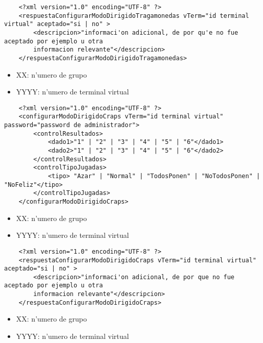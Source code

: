 \begin{verbatim}
    <?xml version="1.0" encoding="UTF-8" ?>
    <respuestaConfigurarModoDirigidoTragamonedas vTerm="id terminal virtual" aceptado="si | no" >
        <descripcion>"informaci'on adicional, de por qu'e no fue aceptado por ejemplo u otra
        informacion relevante"</descripcion>
    </respuestaConfigurarModoDirigidoTragamonedas>
\end{verbatim}


 
\begin{itemize}
    \item{XX: n'umero de grupo}
    \item{YYYY: n'umero de terminal virtual}
\end{itemize}

\begin{verbatim}
    <?xml version="1.0" encoding="UTF-8" ?>
    <configurarModoDirigidoCraps vTerm="id terminal virtual" password="password de administrador">
        <controlResultados>
            <dado1>"1" | "2" | "3" | "4" | "5" | "6"</dado1>
            <dado2>"1" | "2" | "3" | "4" | "5" | "6"</dado2>
        </controlResultados>
        <controlTipoJugadas>
            <tipo> "Azar" | "Normal" | "TodosPonen" | "NoTodosPonen" | "NoFeliz"</tipo>
        </controlTipoJugadas>
    </configurarModoDirigidoCraps>
\end{verbatim}


 
\begin{itemize}
    \item{XX: n'umero de grupo}
    \item{YYYY: n'umero de terminal virtual}
\end{itemize}

\begin{verbatim}
    <?xml version="1.0" encoding="UTF-8" ?>
    <respuestaConfigurarModoDirigidoCraps vTerm="id terminal virtual" aceptado="si | no" >
        <descripcion>"informaci'on adicional, de por que no fue aceptado por ejemplo u otra
        informacion relevante"</descripcion>
    </respuestaConfigurarModoDirigidoCraps>
\end{verbatim}


 
\begin{itemize}
    \item{XX: n'umero de grupo}
    \item{YYYY: n'umero de terminal virtual}
\end{itemize}


